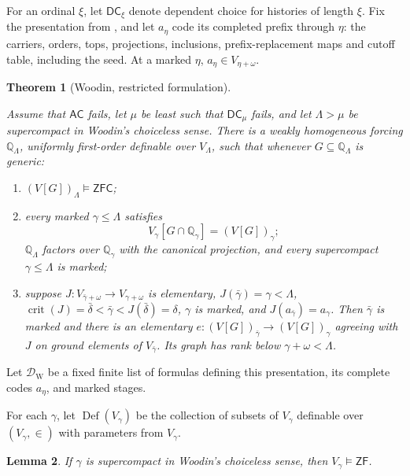\documentclass[11pt,a4paper]{amsart}
\newcommand{\AC}{\mathsf{AC}}
\newcommand{\ZF}{\mathsf{ZF}}
\newcommand{\ZFC}{\mathsf{ZFC}}
\newcommand{\Def}{\operatorname{Def}}
\newcommand{\DC}{\mathsf{DC}}
\newcommand{\crit}{\operatorname{crit}}
\theoremstyle{plain}
\newtheorem{theorem}{Theorem}[section]
\newtheorem{lemma}[theorem]{Lemma}
\theoremstyle{definition}
\theoremstyle{remark}
\begin{document}
{\color{auditgreen}For an ordinal $\xi$, let $\DC_\xi$ denote dependent choice for histories of length $\xi$.  Fix the presentation from \cite[Woodin supplement]{RepairNotes}, and let $a_\eta$ code its completed prefix through $\eta$: the carriers, orders, tops, projections, inclusions, prefix-replacement maps and cutoff table, including the seed.  At a marked $\eta$, $a_\eta\in V_{\eta+\omega}$.}

\begin{theorem}[{\color{auditgreen}Woodin, restricted formulation}]\label{thm:Woodin-forcing}

Assume that $\AC$ fails, let $\mu$ be least such that $\DC_\mu$ fails, and let $\Lambda>\mu$ be supercompact in Woodin's choiceless sense.  {\color{auditgreen}There is a weakly homogeneous forcing $\mathbb Q_\Lambda$, uniformly first-order definable over $V_\Lambda$}, such that whenever $G\subseteq\mathbb Q_\Lambda$ is generic:

\begin{enumerate}
\item $(V[G])_\Lambda\models\ZFC$;
\item {every marked $\gamma\leq\Lambda$ satisfies
\[
V_\gamma[G\cap\mathbb Q_\gamma]=(V[G])_\gamma;
\]
$\mathbb Q_\Lambda$ factors over $\mathbb Q_\gamma$ with the canonical projection, and every supercompact $\gamma\leq\Lambda$ is marked;}
\item {\color{auditgreen}suppose $J:V_{\bar\gamma+\omega}\to V_{\gamma+\omega}$ is elementary, $J(\bar\gamma)=\gamma<\Lambda$, $\crit(J)=\bar\delta<\bar\gamma<J(\bar\delta)=\delta$, $\gamma$ is marked, and $J(a_{\bar\gamma})=a_\gamma$.  Then $\bar\gamma$ is marked and there is an elementary $e:(V[G])_{\bar\gamma}\longrightarrow(V[G])_\gamma$ agreeing with $J$ on ground elements of $V_{\bar\gamma}$.  Its graph has rank below $\gamma+\omega<\Lambda$.}
\end{enumerate}
\end{theorem}

{\color{auditgreen}Let $\mathcal D_{\mathrm W}$ be a fixed finite list of formulas defining this presentation, its complete codes $a_\eta$, and marked stages.}

For each $\gamma$, let $\Def(V_\gamma)$ be the collection of subsets of $V_\gamma$ definable over $(V_\gamma,\in)$ with parameters from $V_\gamma$.

\begin{lemma}\label{lem:supercompact-rank-ZF}
If $\gamma$ is supercompact in Woodin's choiceless sense, then $V_\gamma\models\ZF$.
\end{lemma}
\end{document}
